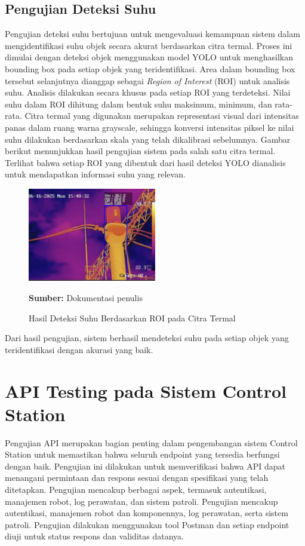 \subsection{Pengujian Deteksi Suhu}

Pengujian deteksi suhu bertujuan untuk mengevaluasi kemampuan sistem dalam mengidentifikasi suhu objek secara akurat berdasarkan citra termal. Proses ini dimulai dengan deteksi objek menggunakan model YOLO untuk menghasilkan bounding box pada setiap objek yang teridentifikasi. Area dalam bounding box tersebut selanjutnya dianggap sebagai \textit{Region of Interest} (ROI) untuk analisis suhu. Analisis dilakukan secara khusus pada setiap ROI yang terdeteksi. Nilai suhu dalam ROI dihitung dalam bentuk suhu maksimum, minimum, dan rata-rata. Citra termal yang digunakan merupakan representasi visual dari intensitas panas dalam ruang warna grayscale, sehingga konversi intensitas piksel ke nilai suhu dilakukan berdasarkan skala yang telah dikalibrasi sebelumnya. Gambar berikut menunjukkan hasil pengujian sistem pada salah satu citra termal. Terlihat bahwa setiap ROI yang dibentuk dari hasil deteksi YOLO dianalisis untuk mendapatkan informasi suhu yang relevan.

\begin{figure}[H]
\centering
\includegraphics[width=0.5\textwidth]{gambar/bab4/swq.png}
\caption{Hasil Deteksi Suhu Berdasarkan ROI pada Citra Termal}
\label{fig:deteksi_suhu}
\footnotesize{\textbf{Sumber:} Dokumentasi penulis}
\end{figure}

Dari hasil pengujian, sistem berhasil mendeteksi suhu pada setiap objek yang teridentifikasi dengan akurasi yang baik. 

\section{API Testing pada Sistem Control Station}
Pengujian API merupakan bagian penting dalam pengembangan sistem Control Station untuk memastikan bahwa seluruh endpoint yang tersedia berfungsi dengan baik. Pengujian ini dilakukan untuk memverifikasi bahwa API dapat menangani permintaan dan respons sesuai dengan spesifikasi yang telah ditetapkan. Pengujian mencakup berbagai aspek, termasuk autentikasi, manajemen robot, log perawatan, dan sistem patroli. Pengujian mencakup autentikasi, manajemen robot dan komponennya, log perawatan, serta sistem patroli. Pengujian dilakukan menggunakan tool Postman dan setiap endpoint diuji untuk status respons dan validitas datanya.

